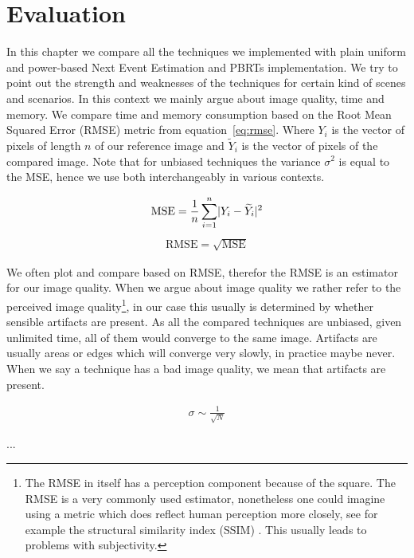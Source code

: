 \chapter{Evaluation}
\label{ch:Evaluation}
In this chapter we compare all the techniques we implemented with plain uniform and power-based Next Event Estimation and PBRTs implementation. We try to point out the strength and weaknesses of the techniques for certain kind of scenes and scenarios. In this context we mainly argue about image quality, time and memory. We compare time and memory consumption based on the Root Mean Squared Error (RMSE) metric from equation~\ref{eq:rmse}. Where $Y_i$ is the vector of pixels of length $n$ of our reference image and $\widetilde{Y}_i$ is the vector of pixels of the compared image. Note that for unbiased techniques the variance $\sigma^2$ is equal to the MSE, hence we use both interchangeably in various contexts. 

\begin{align}\label{eq:mse}
\text{MSE} = \frac{1}{n}\sum_{i=1}^{n}\lvert Y_i - \widetilde{Y}_i\rvert^2
\end{align}
\begin{align}\label{eq:rmse}
\text{RMSE} = \sqrt{\text{MSE}}
\end{align}


We often plot and compare based on RMSE, therefor the RMSE is an estimator for our image quality. When we argue about image quality we rather refer to the perceived image quality\footnote{The RMSE in itself has a perception component because of the square. The RMSE is a very commonly used estimator, nonetheless one could imagine using a metric which does reflect human perception more closely, see for example the structural similarity index (SSIM) \parencite{DBLP:journals/tip/WangBSS04}. This usually leads to problems with subjectivity.}, in our case this usually is determined by whether sensible artifacts are present. As all the compared techniques are unbiased, given unlimited time, all of them would converge to the same image. Artifacts are usually areas or edges which will converge very slowly, in practice maybe never. When we say a technique has a bad image quality, we mean that artifacts are present. 

\begin{align}\label{eq:sigmaCor}
\sigma \sim \frac{1}{\sqrt{N}}
\end{align}

...

